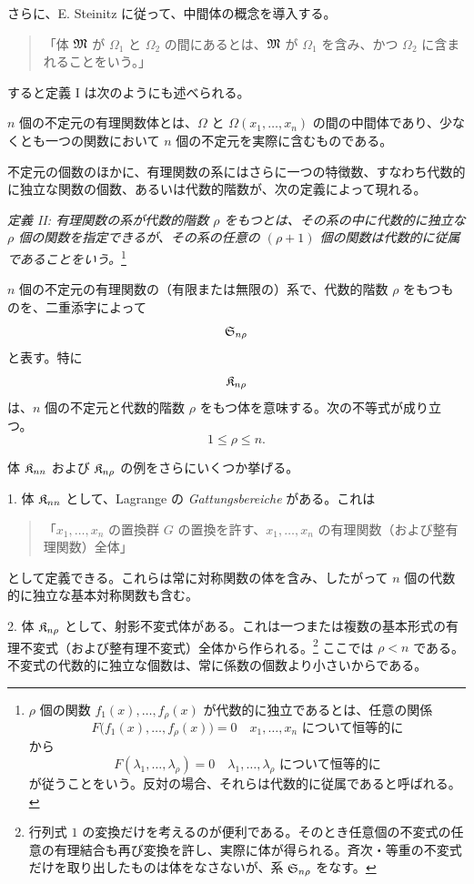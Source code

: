 \documentclass[11pt]{jlreq}
\begin{document}
さらに、E. Steinitz に従って、中間体の概念を導入する。
\begin{quote}
「体 $\mathfrak{M}$ が $\Omega_1$ と $\Omega_2$ の間にあるとは、$\mathfrak{M}$ が $\Omega_1$ を含み、かつ $\Omega_2$ に含まれることをいう。」
\end{quote}
すると定義 I は次のようにも述べられる。

$n$ 個の不定元の有理関数体とは、$\Omega$ と $\Omega(x_1,\ldots,x_n)$ の間の中間体であり、少なくとも一つの関数において $n$ 個の不定元を実際に含むものである。

不定元の個数のほかに、有理関数の系にはさらに一つの特徴数、すなわち代数的に独立な関数の個数、あるいは代数的階数が、次の定義によって現れる。

\emph{定義 II: 有理関数の系が代数的階数 $\rho$ をもつとは、その系の中に代数的に独立な $\rho$ 個の関数を指定できるが、その系の任意の $(\rho+1)$ 個の関数は代数的に従属であることをいう。}\footnote{$\rho$ 個の関数 $f_1(x),\ldots,f_\rho(x)$ が代数的に独立であるとは、任意の関係
\[
F\bigl(f_1(x),\ldots,f_\rho(x)\bigr)=0\quad\text{$x_1,\ldots,x_n$ について恒等的に}
\]
から
\[
F(\lambda_1,\ldots,\lambda_\rho)=0\quad\text{$\lambda_1,\ldots,\lambda_\rho$ について恒等的に}
\]
が従うことをいう。反対の場合、それらは代数的に従属であると呼ばれる。}

$n$ 個の不定元の有理関数の（有限または無限の）系で、代数的階数 $\rho$ をもつものを、二重添字によって
\[
  \mathfrak{S}_{n\rho}
\]
と表す。特に
\[
  \mathfrak{K}_{n\rho}
\]
は、$n$ 個の不定元と代数的階数 $\rho$ をもつ体を意味する。次の不等式が成り立つ。
\[
  1\leq \rho\leq n.
\]

体 $\mathfrak{K}_{nn}$ および $\mathfrak{K}_{n\rho}$ の例をさらにいくつか挙げる。

1. 体 $\mathfrak{K}_{nn}$ として、Lagrange の \emph{Gattungsbereiche} がある。これは
\begin{quote}
「$x_1,\ldots,x_n$ の置換群 $G$ の置換を許す、$x_1,\ldots,x_n$ の有理関数（および整有理関数）全体」
\end{quote}
として定義できる。これらは常に対称関数の体を含み、したがって $n$ 個の代数的に独立な基本対称関数も含む。

2. 体 $\mathfrak{K}_{n\rho}$ として、射影不変式体がある。これは一つまたは複数の基本形式の有理不変式（および整有理不変式）全体から作られる。\footnote{行列式 $1$ の変換だけを考えるのが便利である。そのとき任意個の不変式の任意の有理結合も再び変換を許し、実際に体が得られる。斉次・等重の不変式だけを取り出したものは体をなさないが、系 $\mathfrak{S}_{n\rho}$ をなす。} ここでは $\rho<n$ である。不変式の代数的に独立な個数は、常に係数の個数より小さいからである。
\end{document}
